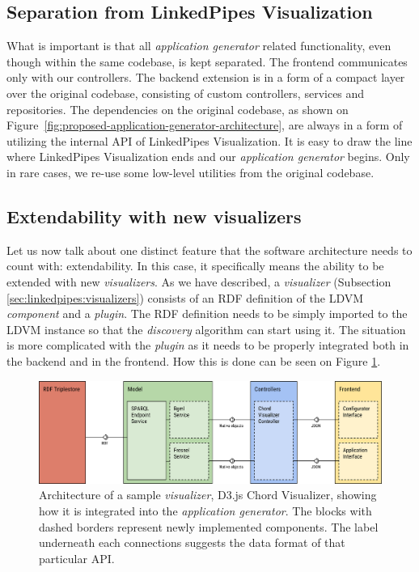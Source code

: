 \subsection{Separation from LinkedPipes Visualization}

What is important is that all \emph{application generator} related functionality, even though within the same codebase, is kept separated. The frontend communicates only with our controllers. The backend extension is in a form of a compact layer over the original codebase, consisting of custom controllers, services and repositories. The dependencies on the original codebase, as shown on Figure~\ref{fig:proposed-application-generator-architecture}, are always in a form of utilizing the internal API of LinkedPipes Visualization. It is easy to draw the line where LinkedPipes Visualization ends and our \emph{application generator} begins. Only in rare cases, we re-use some low-level utilities from the original codebase.

\subsection{Extendability with new visualizers}

Let us now talk about one distinct feature that the software architecture needs to count with: extendability. In this case, it specifically means the ability to be extended with new \emph{visualizers}. As we have described, a \emph{visualizer} (Subsection \ref{sec:linkedpipes:visualizers}) consists of an RDF definition of the LDVM \emph{component} and a \emph{plugin}. The RDF definition needs to be simply imported to the LDVM instance so that the \emph{discovery} algorithm can start using it. The situation is more complicated with the \emph{plugin} as it needs to be properly integrated both in the backend and in the frontend. How this is done can be seen on Figure \ref{fig:sample-visualizer-structure}.

\begin{figure}
	\centering
	\includegraphics[width=140mm]{img/04_chord_visualizer_structure.png}
	\caption{Architecture of a sample \emph{visualizer}, D3.js Chord Visualizer, showing how it is integrated into the \emph{application generator}. The blocks with dashed borders represent newly implemented components. The label underneath each connections suggests the data format of that particular API.} 
	\label{fig:sample-visualizer-structure}
\end{figure}


